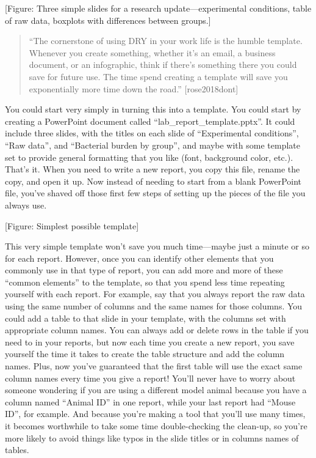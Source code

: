 \documentclass[]{tufte-book}
\begin{document}
{[}Figure: Three simple slides for a research update---experimental conditions,
table of raw data, boxplots with differences between groups.{]}

\begin{quote}
``The cornerstone of using DRY in your work life is the humble template.
Whenever you create something, whether it's an email, a business document,
or an infographic, think if there's something there you could save for
future use. The time spend creating a template will save you exponentially
more time down the road.'' {[}rose2018dont{]}
\end{quote}

You could start very simply in turning this into a template. You could start by
creating a PowerPoint document called ``lab\_report\_template.pptx''. It could
include three slides, with the titles on each slide of ``Experimental
conditions'', ``Raw data'', and ``Bacterial burden by group'', and maybe with some
template set to provide general formatting that you like (font, background
color, etc.). That's it. When you need to write a new report, you copy this file,
rename the copy, and open it up. Now instead of needing to start from a blank
PowerPoint file, you've shaved off those first few steps of setting up the
pieces of the file you always use.

{[}Figure: Simplest possible template{]}

This very simple template won't save you much time---maybe just a minute or so for
each report. However, once you can identify other elements that you commonly use
in that type of report, you can add more and more of these ``common elements'' to the
template, so that you spend less time repeating yourself with each report. For
example, say that you always report the raw data using the same number of columns
and the same names for those columns. You could add a table to that slide in your
template, with the columns set with appropriate column names. You can always add or
delete rows in the table if you need to in your reports, but now each time you
create a new report, you save yourself the time it takes to create the table
structure and add the column names. Plus, now you've guaranteed that the first
table will use the exact same column names every time you give a report! You'll never
have to worry about someone wondering if you are using a different model animal
because you have a column named ``Animal ID'' in one report, while your last report
had ``Mouse ID'', for example. And because you're making a tool that you'll use many
times, it becomes worthwhile to take some time double-checking the clean-up, so
you're more likely to avoid things like typos in the slide titles or in columns names
of tables.
\end{document}
